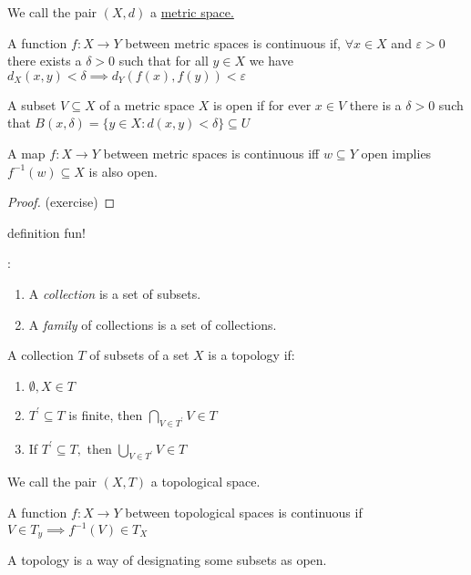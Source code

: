 We call the pair $(X, d)$ a \underline{metric space.}

\begin{definition}
A function $f : X \to Y$ between metric spaces is continuous if, $\forall x \in X$ and $\varepsilon >0 $ there exists a $\delta >0$ such that for all $y \in X$ we have $d_X (x, y) < \delta \implies d_Y(f(x), f(y)) < \varepsilon$	
\end{definition}

A subset $V \subseteq X$ of a metric space $X$ is open if for ever $x \in V$ there is a $\delta >0 $ such that $B(x,\delta) = \{y \in X: d(x,y) < \delta\} \subseteq U$ 

\begin{theorem}
	A map $f:X \to Y$ between metric spaces is continuous iff  $w \subseteq Y$ open implies $f^{-1}(w) \subseteq X$ is also open.
\end{theorem}

\begin{proof}
	(exercise)
\end{proof}

definition fun! \\
\begin{definition}:
\begin{enumerate}
	\item A \emph{collection} is a set of subsets. 
	\item A \emph{family} of collections is a set of collections.
\end{enumerate}
\end{definition}

\begin{definition}
	A collection $T$ of subsets of a set $X$ is a topology if:
	\begin{enumerate}
		\item $\emptyset, X \in T$ 
		\item $T^{'} \subseteq T$ is finite, then $\bigcap\limits_{V \in T^{'}} V \in T$ 
		\item If $T^{'} \subseteq T,$ then $\bigcup\limits_{V \in T^{'}} V \in T$
	\end{enumerate}

	We call the pair $(X, T)$ a topological space.
\end{definition}


A function $f:X \to Y$ between topological spaces is continuous if $V \in T_y \implies f^{-1}(V) \in T_X$

\begin{claim*}
	A topology is a way of designating some subsets as open.	
\end{claim*}

